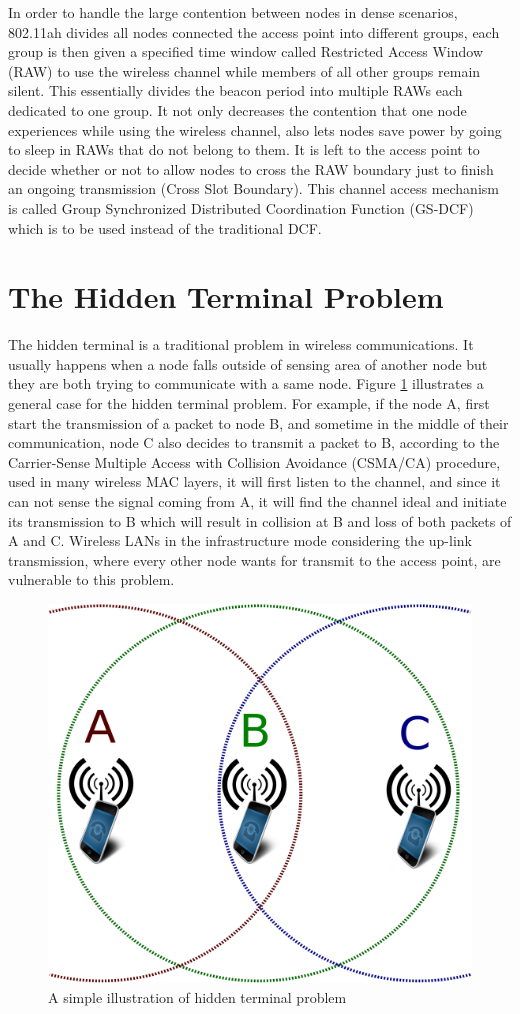  In order to handle the large contention between nodes in dense scenarios, 802.11ah divides all nodes connected the access point into different groups, each group is then given a specified time window called Restricted Access Window (RAW) to use the wireless channel while members of all other groups remain silent. This essentially divides the beacon period into multiple RAWs each dedicated to one group. It not only decreases the contention that one node experiences while using the wireless channel, also lets nodes save power by going to sleep in RAWs that do not belong to them. It is left to the access point to decide whether or not to allow nodes to cross the RAW boundary just to finish an ongoing transmission (Cross Slot Boundary). This channel access mechanism is called Group Synchronized Distributed Coordination Function (GS-DCF) which is to be used instead of the traditional DCF.   

\section{The Hidden Terminal Problem}

The hidden terminal is a traditional problem in wireless communications. It usually happens when a node falls outside of sensing area of another node but they are both trying to communicate with a same node. Figure \ref{fig:hidden} illustrates a general case for the hidden terminal problem. For example, if the node A, first start the transmission of a packet to node B, and sometime in the middle of their communication, node C also decides to transmit a packet to B, according to the Carrier-Sense Multiple Access with Collision Avoidance (CSMA/CA) procedure, used in many wireless MAC layers, it will first listen to the channel, and since it can not sense the signal coming from A, it will find the channel ideal and initiate its transmission to B which will result in collision at B and loss of both packets of A and C. Wireless LANs in the infrastructure mode considering the up-link transmission, where every other node wants for transmit to the access point, are vulnerable to this problem. 


\begin{figure} [h]
  \centering
  \includegraphics[width=.65\textwidth]{figures/hidden}
  \caption{A simple illustration of hidden terminal problem}
  \label{fig:hidden}
\end{figure}

